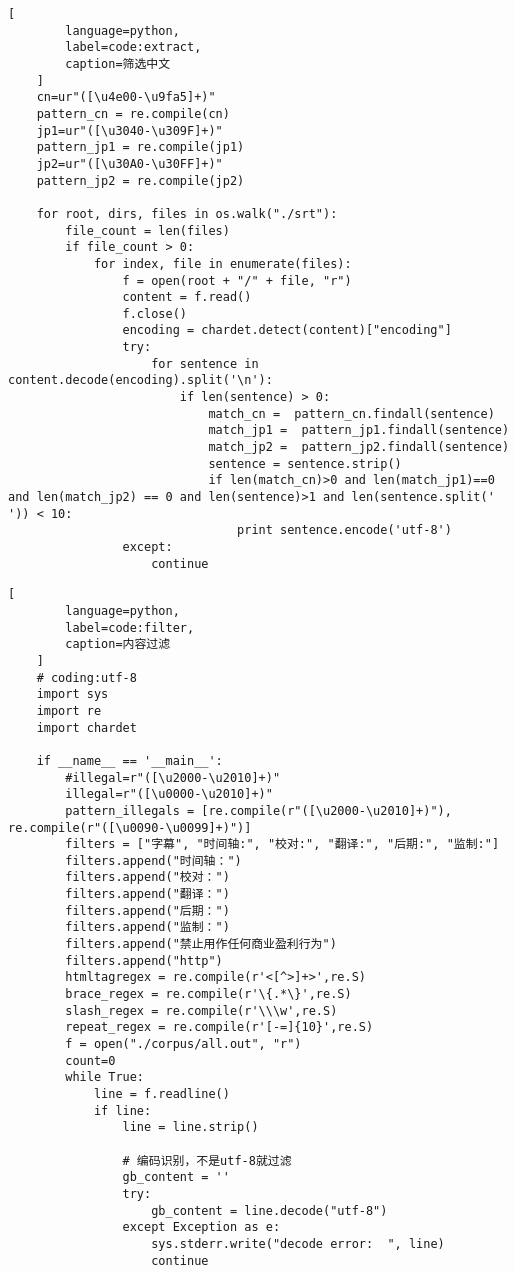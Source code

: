 \begin{appendices}
\begin{lstlisting}[
        language=python,
        label=code:extract,
        caption=筛选中文
    ]
    cn=ur"([\u4e00-\u9fa5]+)"
    pattern_cn = re.compile(cn)
    jp1=ur"([\u3040-\u309F]+)"
    pattern_jp1 = re.compile(jp1)
    jp2=ur"([\u30A0-\u30FF]+)"
    pattern_jp2 = re.compile(jp2)
    
    for root, dirs, files in os.walk("./srt"):
        file_count = len(files)
        if file_count > 0:
            for index, file in enumerate(files):
                f = open(root + "/" + file, "r")
                content = f.read()
                f.close()
                encoding = chardet.detect(content)["encoding"]
                try:
                    for sentence in content.decode(encoding).split('\n'):
                        if len(sentence) > 0:
                            match_cn =  pattern_cn.findall(sentence)
                            match_jp1 =  pattern_jp1.findall(sentence)
                            match_jp2 =  pattern_jp2.findall(sentence)
                            sentence = sentence.strip()
                            if len(match_cn)>0 and len(match_jp1)==0 and len(match_jp2) == 0 and len(sentence)>1 and len(sentence.split(' ')) < 10:
                                print sentence.encode('utf-8')
                except:
                    continue
    \end{lstlisting}
    \begin{lstlisting}[
        language=python,
        label=code:filter,
        caption=内容过滤
    ]
    # coding:utf-8
    import sys
    import re
    import chardet
    
    if __name__ == '__main__':
        #illegal=r"([\u2000-\u2010]+)"
        illegal=r"([\u0000-\u2010]+)"
        pattern_illegals = [re.compile(r"([\u2000-\u2010]+)"), re.compile(r"([\u0090-\u0099]+)")]
        filters = ["字幕", "时间轴:", "校对:", "翻译:", "后期:", "监制:"]
        filters.append("时间轴：")
        filters.append("校对：")
        filters.append("翻译：")
        filters.append("后期：")
        filters.append("监制：")
        filters.append("禁止用作任何商业盈利行为")
        filters.append("http")
        htmltagregex = re.compile(r'<[^>]+>',re.S)
        brace_regex = re.compile(r'\{.*\}',re.S)
        slash_regex = re.compile(r'\\\w',re.S)
        repeat_regex = re.compile(r'[-=]{10}',re.S)
        f = open("./corpus/all.out", "r")
        count=0
        while True:
            line = f.readline()
            if line:
                line = line.strip()
    
                # 编码识别，不是utf-8就过滤
                gb_content = ''
                try:
                    gb_content = line.decode("utf-8")
                except Exception as e:
                    sys.stderr.write("decode error:  ", line)
                    continue
    

\end{lstlisting}
\end{appendices}

